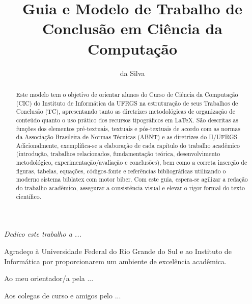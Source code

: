\documentclass[cic,tc,biblatex]{iiufrgs}
\title{Guia e Modelo de Trabalho de Conclusão em Ciência da Computação}
\author{da Silva}{João}
\begin{document}

\maketitle

\begin{dedicatoria}
\textit{Dedico este trabalho a ...\\}
\end{dedicatoria}

\begin{agradecimentos}
Agradeço à Universidade Federal do Rio Grande do Sul e ao Instituto de Informática por proporcionarem um ambiente de excelência acadêmica.

Ao meu orientador/a pela ...

Aos colegas de curso e amigos pelo ...
\end{agradecimentos}

\begin{abstract}
Este modelo tem o objetivo de orientar alunos do Curso de Ciência da Computação (CIC) do Instituto de Informática da UFRGS na estruturação de seus Trabalhos de Conclusão (TC), apresentando tanto as diretrizes metodológicas de organização de conteúdo quanto o uso prático dos recursos tipográficos em \LaTeX. São descritas as funções dos elementos pré-textuais, textuais e pós-textuais de acordo com as normas da Associação Brasileira de Normas Técnicas (ABNT) e as diretrizes do II/UFRGS. Adicionalmente, exemplifica-se a elaboração de cada capítulo do trabalho acadêmico (introdução, trabalhos relacionados, fundamentação teórica, desenvolvimento metodológico, experimentação/avaliação e conclusões), bem como a correta inserção de figuras, tabelas, equações, códigos-fonte e referências bibliográficas utilizando o moderno sistema \textsf{biblatex} com motor \textsf{biber}. Com este guia, espera-se agilizar a redação do trabalho acadêmico, assegurar a consistência visual e elevar o rigor formal do texto científico.
\end{abstract}
\end{document}
